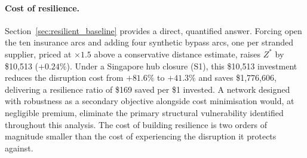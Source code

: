 \paragraph{Cost of resilience.}
Section~\ref{sec:resilient_baseline} provides a direct, quantified
answer. Forcing open the ten insurance arcs and adding four
synthetic bypass arcs, one per stranded supplier, priced at
$\times 1.5$ above a conservative distance estimate,
raises $Z^*$ by \$10{,}513 ($+0.24\%$). Under a Singapore hub
closure (S1), this \$10{,}513 investment reduces the disruption
cost from $+81.6\%$ to $+41.3\%$ and saves \$1{,}776{,}606,
delivering a resilience ratio of \$169 saved per \$1 invested.
A network designed with robustness as a secondary objective
alongside cost minimisation would, at negligible premium,
eliminate the primary structural vulnerability identified
throughout this analysis. The cost of building resilience is
two orders of magnitude smaller than the cost of experiencing
the disruption it protects against.